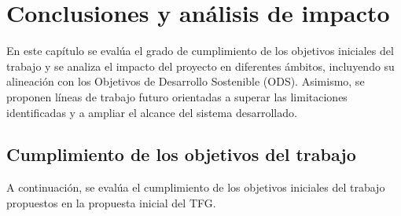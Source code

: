 \chapter{Conclusiones y análisis de impacto}
En este capítulo se evalúa el grado de cumplimiento de los objetivos iniciales del trabajo y se analiza el impacto del proyecto en diferentes ámbitos, incluyendo su alineación con los Objetivos de Desarrollo Sostenible (ODS). Asimismo, se proponen líneas de trabajo futuro orientadas a superar las limitaciones identificadas y a ampliar el alcance del sistema desarrollado.

\section{Cumplimiento de los objetivos del trabajo}
A continuación, se evalúa el cumplimiento de los objetivos iniciales del trabajo propuestos en la propuesta inicial del TFG.

